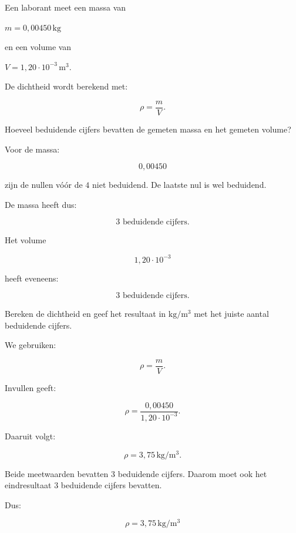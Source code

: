 \documentclass{ximera}
\begin{document}
\begin{oefening}{\oefB\ESS}

Een laborant meet een massa van

\(
m=0{,}00450\,\si{\kilogram}
\)

en een volume van

\(
V=1{,}20\cdot10^{-3}\,\si{\meter\cubed}.
\)

De dichtheid wordt berekend met:

\[
\rho=\frac{m}{V}.
\]

\begin{question}
Hoeveel beduidende cijfers bevatten de gemeten massa en het gemeten volume?

\begin{oplossing}
Voor de massa:

\[
0{,}00450
\]

zijn de nullen vóór de $4$ niet beduidend. De laatste nul is wel beduidend.

De massa heeft dus:

\[
\boxed{3\text{ beduidende cijfers}}.
\]

Het volume

\[
1{,}20\cdot10^{-3}
\]

heeft eveneens:

\[
\boxed{3\text{ beduidende cijfers}}.
\]
\end{oplossing}
\end{question}


\begin{question}
Bereken de dichtheid en geef het resultaat in
$\si{\kilogram\per\meter\cubed}$ met het juiste aantal beduidende cijfers.

\begin{oplossing}
We gebruiken:

\[
\rho=\frac{m}{V}.
\]

Invullen geeft:

\[
\rho
=
\frac{0{,}00450}
{1{,}20\cdot10^{-3}}.
\]

Daaruit volgt:

\[
\rho=3{,}75\,\si{\kilogram\per\meter\cubed}.
\]

Beide meetwaarden bevatten $3$ beduidende cijfers. Daarom moet ook het
eindresultaat $3$ beduidende cijfers bevatten.

Dus:

\[
\boxed{
\rho=3{,}75\,\si{\kilogram\per\meter\cubed}
}
\]
\end{oplossing}
\end{question}

\end{oefening}
\end{document}
